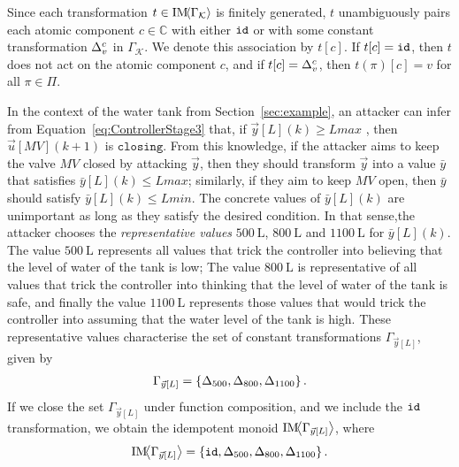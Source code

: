 {\begin{definition}
Since each transformation $t\in \text{IM}\!{{\left<\Gamma_{\mathcal{K}}\right>}}$ is finitely generated, $t$ unambiguously pairs each atomic component $c\in \mathbb{C}$ with either ${\texttt{id}}$ or with some constant transformation ${\Delta}^{c}_{v}$ in $\Gamma_{\mathcal{K}}$.  We denote this association by $t[c]$. If $t[c]={\texttt{id}}$, then $t$ does not act on the atomic component $c$, and if $t[c]={\Delta}^{c}_{v}$, then $t(\pi)[c]=v$ for all $\pi \in \Pi$.
\end{definition}
\begin{example}
  In the context of the water tank from Section~\ref{sec:example}, an attacker can infer from Equation~\ref{eq:ControllerStage3} that, if $\vec{y}[L](k)\geq Lmax$%
  , then $\vec{u}[MV](k+1)$ is $\texttt{closing}$. From this knowledge, if the attacker aims to keep the valve $MV$ closed by attacking $\vec{y}$, then they should transform $\vec{y}$ into a value $\bar{y}$ that satisfies $\bar{y}[L](k)\leq Lmax$; similarly, if they aim to keep $MV$ open, then $\bar{y}$ should satisfy $\bar{y}[L](k)\leq Lmin$. The concrete values of $\bar{y}[L](k)$ are unimportant as long as they satisfy the desired condition. In that sense,the attacker chooses the \emph{representative values} $500~\mathrm{L}$, $800~\mathrm{L}$ and $1100~\mathrm{L}$ for $\bar{y}[L](k)$. The value $500~\mathrm{L}$ represents all values that trick the controller into believing that the level of water of the tank is low; The value $800~\mathrm{L}$ is representative of all values that trick the controller into thinking that the level of water of the tank is safe, and finally the value  $1100~\mathrm{L}$ represents those values that would trick the controller into assuming that the water level of the tank is high.  
  These representative values characterise the set of constant transformations $\Gamma_{\vec{y}[L]}$, given by
\begin{align}
  \Gamma_{\vec{y}[L]}=\left\{{\Delta}_{500}, {\Delta}_{800},  {\Delta}_{1100}\right\}.
\end{align}
If we close the set $\Gamma_{\vec{y}[L]}$ under function composition, and we include the ${\texttt{id}}$ transformation, we obtain the idempotent monoid $\text{IM}\!{{\left<\Gamma_{\vec{y}[L]}\right>}}$, where 
\begin{align*}
  \text{IM}\!{{\left<\Gamma_{\vec{y}[L]}\right>}} =\left\{{\texttt{id}}, {\Delta}_{500}, {\Delta}_{800},{\Delta}_{1100}\right\}.
\end{align*} 
\end{example}

}
